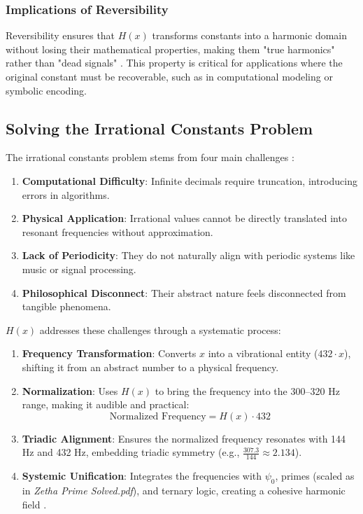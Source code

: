 \subsubsection{Implications of Reversibility}
Reversibility ensures that \( H(x) \) transforms constants into a harmonic domain without losing their mathematical properties, making them "true harmonics" rather than "dead signals" \cite{harmonic_reversible}. This property is critical for applications where the original constant must be recoverable, such as in computational modeling or symbolic encoding.

\subsection{Solving the Irrational Constants Problem}
\label{subsec:h_x_irrational_problem}
The irrational constants problem stems from four main challenges \cite{irrational_constant_solved}:
\begin{enumerate}
    \item \textbf{Computational Difficulty}: Infinite decimals require truncation, introducing errors in algorithms.
    \item \textbf{Physical Application}: Irrational values cannot be directly translated into resonant frequencies without approximation.
    \item \textbf{Lack of Periodicity}: They do not naturally align with periodic systems like music or signal processing.
    \item \textbf{Philosophical Disconnect}: Their abstract nature feels disconnected from tangible phenomena.
\end{enumerate}

\( H(x) \) addresses these challenges through a systematic process:

\begin{enumerate}
    \item \textbf{Frequency Transformation}: Converts \( x \) into a vibrational entity (\( 432 \cdot x \)), shifting it from an abstract number to a physical frequency.
    \item \textbf{Normalization}: Uses \( H(x) \) to bring the frequency into the 300--320 Hz range, making it audible and practical:
    \[
    \text{Normalized Frequency} = H(x) \cdot 432
    \]
    \item \textbf{Triadic Alignment}: Ensures the normalized frequency resonates with 144 Hz and 432 Hz, embedding triadic symmetry (e.g., \( \frac{307.3}{144} \approx 2.134 \)).
    \item \textbf{Systemic Unification}: Integrates the frequencies with \( \psi_0 \), primes (scaled as in \textit{Zetha Prime Solved.pdf}), and ternary logic, creating a cohesive harmonic field \cite{zetha_prime, harmonic_reversible}.
\end{enumerate}

